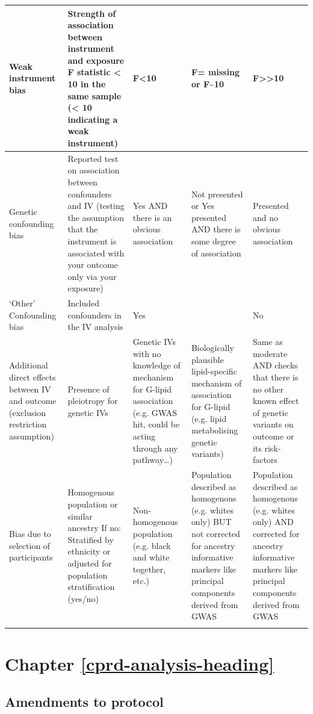 \documentclass[a4paper, twoside]{templates/ociamthesis}
\begin{document}
\begin{longtable}[t]{>{\raggedright\arraybackslash}p{6.4em}>{\raggedright\arraybackslash}p{6.4em}>{\raggedright\arraybackslash}p{6.4em}>{\raggedright\arraybackslash}p{6.4em}>{\raggedright\arraybackslash}p{6.4em}}
\endfoot
\bottomrule
\endlastfoot
Weak instrument bias & Strength of association between instrument and exposure F statistic < 10 in the same sample  (< 10 indicating a weak instrument) & F<10 & F= missing or F\textasciitilde{}10 & F>>10\\
\midrule
Genetic confounding bias & Reported test on association between confounders and IV (testing the assumption that the instrument is associated with your outcome only via your exposure) & Yes AND there is an obvious association & Not presented or 
Yes presented AND there is some degree of association & Presented and no obvious association\\
\midrule
‘Other’ Confounding bias & Included confounders in the IV analysis & Yes &  & No\\
\midrule
Additional direct effects between IV and outcome (exclusion restriction assumption) & Presence of pleiotropy for genetic IVs & Genetic IVs with no knowledge of mechanism for G-lipid association (e.g. GWAS hit, could be acting through any pathway…) & Biologically plausible lipid-specific mechanism of association for G-lipid (e.g. lipid metabolising genetic variants) & Same as moderate AND checks that there is no other known effect of genetic variants on outcome or its risk-factors\\
\midrule
Bias due to selection of participants & Homogenous population or similar ancestry 
If no: Stratified by ethnicity or adjusted for population stratification (yes/no) & Non-homogenous population (e.g. black and white together, etc.) & Population described as homogenous (e.g. whites only) BUT not corrected for ancestry informative markers like principal components derived from GWAS & Population described as homogenous (e.g. whites only) AND corrected for ancestry informative markers like principal components derived from GWAS\\*
\end{longtable}

\hypertarget{appendix-cprd-analysis}{%
\section{Chapter \ref{cprd-analysis-heading}}\label{appendix-cprd-analysis}}

\hypertarget{appendix-cprd-amendments}{%
\subsection{Amendments to protocol}\label{appendix-cprd-amendments}}
\end{document}
